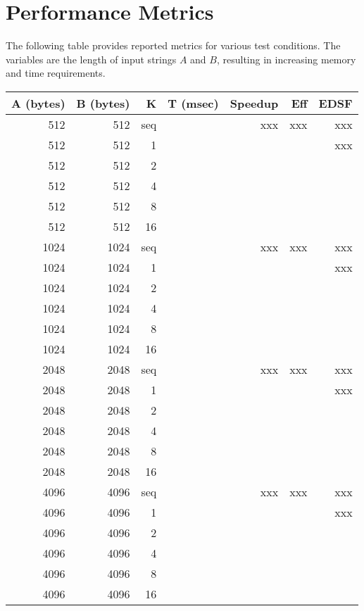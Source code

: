 \section{Performance Metrics}
\label{sec:metrics}
The following table provides reported metrics for various test conditions. The variables are the length of input strings $A$ and $B$, resulting in increasing memory and time requirements.

\begin{center}
    \begin{tabular}{ | r | r | r | r | r | r | r |}
    \hline
    A (bytes)&	B (bytes) &	K	&	T (msec)	&	Speedup	&	Eff	&	EDSF \\
	\hline																	 
    512     &	512     &	seq	& 				&	xxx		&	xxx	&	xxx  \\
    512     &	512     &	1	&		 	 	&			&		&	xxx \\
    512     &	512     &	2	&	 	 	 	&			&		&\\
    512     &	512     &	4	&	 	 	 	&			&		&\\
    512     &	512     &	8	&	 	 	 	&			&		&\\
    512     &	512     &	16	&				&	 	 	&		&\\
	1024    &	1024    &	seq	&		 		&	xxx		&	xxx	&	xxx \\
    1024    &	1024    &	1	&	 	 		&			&		&	xxx \\
    1024    &	1024    &	2	&	 	 	 	&			&		&\\
    1024    &	1024    &	4	&	 	 	 	&			&		&\\
    1024    &	1024    &	8	&	 	 	 	&			&		&\\
    1024    &	1024    &	16	&	 	 	 	&			&		&\\
	2048    &	2048    &	seq	&				&	xxx		&	xxx	&	xxx \\
    2048   	&	2048   	&	1	&	 	 		&			&		&	xxx \\
    2048   	&	2048   	&	2	&	 	 	 	&			&		&\\
    2048   	&	2048   	&	4	&	 	 	 	&			&		&\\
    2048   	&	2048   	&	8	&	 	 	 	&			&		&\\
    2048   	&	2048   	&	16	&	 	 	 	&			&		&\\
                        
	4096    &	4096    &	seq	&				&	xxx		&	xxx	&	xxx \\
    4096   	&	4096   	&	1	&	 	 		&			&		&	xxx \\
    4096   	&	4096   	&	2	&	 	 	 	&			&		&\\
    4096   	&	4096   	&	4	&	 	 	 	&			&		&\\
    4096   	&	4096   	&	8	&	 	 	 	&			&		&\\
    4096   	&	4096   	&	16	&	 	 	 	&			&		&\\
                        

\end{tabular}
\end{center}
